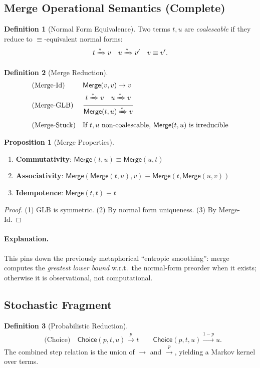 \documentclass[12pt]{article}
\newcommand{\Merge}{\mathsf{Merge}}
\newcommand{\Choice}{\mathsf{Choice}}
\newcommand{\step}{\rightarrow}
\newcommand{\pstep}[1]{\xrightarrow{#1}}
\newcommand{\steps}{\xRightarrow{*}}
\theoremstyle{definition}
\newtheorem{definition}{Definition}
\newtheorem{proposition}{Proposition}
\begin{document}
\subsection{Merge Operational Semantics (Complete)}
\begin{definition}[Normal Form Equivalence]
Two terms $t, u$ are \emph{coalescable} if they reduce to $\equiv$-equivalent normal forms:
$$t \steps v \quad u \steps v' \quad v \equiv v'.$$
\end{definition}

\begin{definition}[Merge Reduction]
\begin{align*}
&\text{(Merge-Id)} && \Merge(v,v) \step v \\
&\text{(Merge-GLB)} && \dfrac{t \steps v \quad u \steps v}{\Merge(t,u) \steps v} \\
&\text{(Merge-Stuck)} && \text{If } t,u \text{ non-coalescable, } \Merge(t,u) \text{ is irreducible}
\end{align*}
\end{definition}

\begin{proposition}[Merge Properties]
\begin{enumerate}
\item \textbf{Commutativity}: $\Merge(t,u) \equiv \Merge(u,t)$
\item \textbf{Associativity}: $\Merge(\Merge(t,u),v) \equiv \Merge(t,\Merge(u,v))$
\item \textbf{Idempotence}: $\Merge(t,t) \equiv t$
\end{enumerate}
\end{proposition}
\begin{proof}
(1) GLB is symmetric. (2) By normal form uniqueness. (3) By Merge-Id.
\end{proof}

\paragraph{Explanation.}
This pins down the previously metaphorical ``entropic smoothing'': merge computes the \emph{greatest lower bound} w.r.t.\ the normal-form preorder when it exists; otherwise it is observational, not computational.

\subsection{Stochastic Fragment}
\begin{definition}[Probabilistic Reduction]
\begin{align*}
&\text{(Choice)} \quad \Choice(p,t,u) \pstep{p} t \qquad \Choice(p,t,u) \pstep{1-p} u.
\end{align*}
The combined step relation is the union of $\step$ and $\pstep{p}$, yielding a Markov kernel over terms.
\end{definition}
\end{document}
